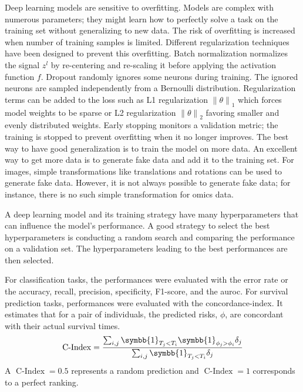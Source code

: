 \documentclass[../main.tex]{subfiles}
\begin{document}

	 Deep learning models are sensitive to overfitting.
	 Models are complex with numerous parameters; they might learn how to perfectly solve a task on the training set without generalizing to new data.
	 The risk of overfitting is increased when number of training samples is limited.
	 Different regularization techniques have been designed to prevent this overfitting.
	 Batch normalization normalizes the signal \(z^{l}\) by re-centering and re-scaling it before applying the activation function \(f\).
	 Dropout randomly ignores some neurons during training.
	 The ignored neurons are sampled independently from a Bernoulli distribution.
	 Regularization terms can be added to the loss such as L1 regularization \({\|\theta\|}_{1}\) which forces model weights to be sparse or L2 regularization \({\|\theta\|}_{2}\) favoring smaller and evenly distributed weights.
	 Early stopping monitors a validation metric; the training is stopped to prevent overfitting when it no longer improves.
	 The best way to have good generalization is to train the model on more data.
	 An excellent way to get more data is to generate fake data and add it to the training set.
	 For images, simple transformations like translations and rotations can be used to generate fake data.
	 However, it is not always possible to generate fake data; for instance, there is no such simple transformation for omics data.

	 A deep learning model and its training strategy have many hyperparameters that can influence the model's performance.
	 A good strategy to select the best hyperparameters is conducting a random search and comparing the performance on a validation set.
	 The hyperparameters leading to the best performances are then selected.

	 For classification tasks, the performances were evaluated with the error rate or the accuracy, recall, precision, specificity, F1-score, and the \gls{auroc}.
	 For survival prediction tasks, performances were evaluated with the concordance-index.
	 It estimates that for a pair of individuals, the predicted risks, \(\phi\),  are concordant with their actual survival times.
	 \begin{equation}
		 \operatorname{C-Index} = \frac{\sum_{i,j}\symbb{1}_{T_j < T_i}\symbb{1}_{\phi_j > \phi_i}\delta_j}{\sum_{i,j}\symbb{1}_{T_j < T_i}\delta_j}
	 \end{equation}
	 A \(\operatorname{C-Index} = 0.5\) represents a random prediction and \(\operatorname{C-Index} = 1\) corresponds to a perfect ranking.
\end{document}
